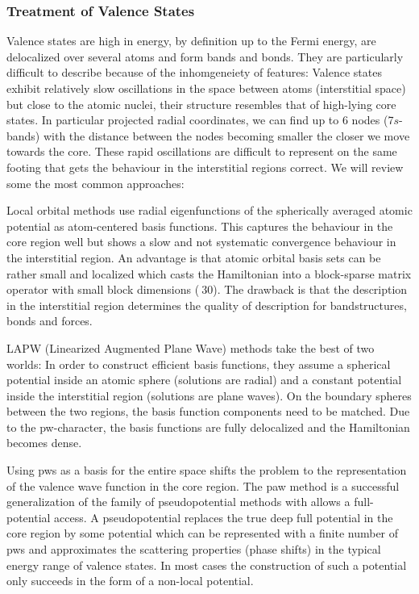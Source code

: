 \documentclass[oribibl]{llncs}
\begin{document}
\subsubsection{Treatment of Valence States}
Valence states are high in energy, by definition up to the Fermi
energy, are delocalized over several atoms and form bands and bonds.
They are particularly difficult to describe because of the 
inhomgeneiety of features:
Valence states exhibit relatively slow oscillations 
in the space between atoms (interstitial space) but close to the atomic nuclei,
their structure resembles that of high-lying core states.
In particular projected radial coordinates, we can find up to $6$ nodes
(7$s$-bands) with the distance between the nodes becoming smaller
the closer we move towards the core.
These rapid oscillations are difficult to represent
on the same footing that gets the behaviour in the interstitial regions correct. 
We will review some the most common approaches:

Local orbital methods use radial eigenfunctions 
of the spherically averaged atomic potential as atom-centered basis functions.
This captures the behaviour in the core region well
but shows a slow and not systematic convergence behaviour in the interstitial region. 
An advantage is that atomic orbital basis sets can be rather small
and localized which casts the Hamiltonian into a block-sparse matrix operator with small block dimensions ($~ 30$).
The drawback is that the description in the interstitial region determines the
quality of description for bandstructures, bonds and forces.

LAPW (Linearized Augmented Plane Wave) methods take the best of two worlds:
In order to construct efficient basis functions, 
they assume a spherical potential inside an atomic sphere (solutions are radial)
and a constant potential inside the interstitial region (solutions are plane waves). On the boundary spheres between the two regions, the basis function components need to be matched.
Due to the \ac{pw}-character, the basis functions are fully delocalized and the
Hamiltonian becomes dense.

Using \ac{pw}s as a basis for the entire space shifts the problem to the representation of the valence wave function in the core region.
The \ac{paw} method is a successful generalization of the family of pseudopotential methods with allows a full-potential access.
A pseudopotential replaces the true deep full potential in the core region
by some potential which can be represented with a finite number of \ac{pw}s
and approximates the scattering properties (phase shifts) in the typical energy
range of valence states.
In most cases the construction of such a potential only succeeds in the form of
a non-local potential.
\end{document}
